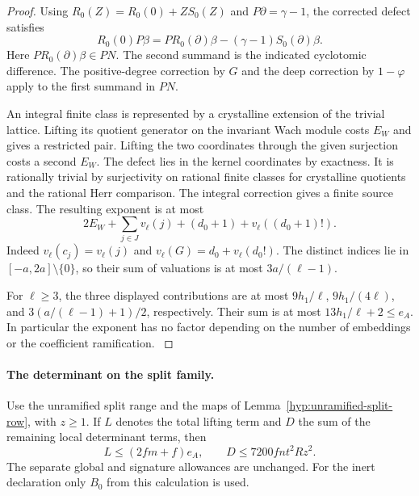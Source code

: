 \begin{proof}
Using \(R_0(Z)=R_0(0)+Z S_0(Z)\) and
\(P\partial=\gamma-1\), the corrected defect satisfies
\[
  R_0(0)P\beta
       =P R_0(\partial)\beta-(\gamma-1)S_0(\partial)\beta .
\]
Here \(P R_0(\partial)\beta\in PN\). The second summand is
the indicated cyclotomic difference. The positive-degree
correction by \(G\) and the deep correction by \(1-\varphi\)
apply to the first summand in \(PN\).

\label{cor:unramified-split-length-3}

An integral finite class is represented by a crystalline extension
of the trivial lattice. Lifting its quotient generator on the
invariant Wach module costs \(E_W\) and gives a restricted pair.
Lifting the two coordinates through the given surjection costs
a second \(E_W\). The defect lies in the kernel coordinates
by exactness. It is rationally trivial by surjectivity on rational
finite classes for crystalline quotients and the rational Herr
comparison. The integral correction gives a finite source class.
The resulting exponent is at most
\[
  2E_W+\sum_{j\in J}v_\ell(j)
       +(d_0+1)+v_\ell((d_0+1)!).
\]
Indeed \(v_\ell(c_j)=v_\ell(j)\) and
\(v_\ell(G)=d_0+v_\ell(d_0!)\).
The distinct indices lie in \([-a,2a]\setminus\{0\}\), so their
sum of valuations is at most \(3a/(\ell-1)\).

For \(\ell\ge3\), the three displayed contributions are at most
\(9h_1/\ell\), \(9h_1/(4\ell)\), and
\(3(a/(\ell-1)+1)/2\), respectively. Their sum is at most
\(13h_1/\ell+2\le e_A\). In particular the exponent has no
factor depending on the number of embeddings or the coefficient
ramification. \label{cor:unramified-split-length-4}
\end{proof}

\paragraph{The determinant on the split family.}
\begin{lemma}
\label{lem:unramified-split-determinant-total}
Use the unramified split range and the maps of
Lemma~\ref{hyp:unramified-split-row}, with \(z\ge1\). If \(L\) denotes the total lifting term and \(D\) the sum of the remaining local determinant terms, then
\[
 L\le (2fm+f)e_A,\qquad D\le7200fnt^2Rz^2.
\]
The separate global and signature allowances are unchanged.
For the inert declaration only \(B_0\) from this calculation
is used.
\end{lemma}


